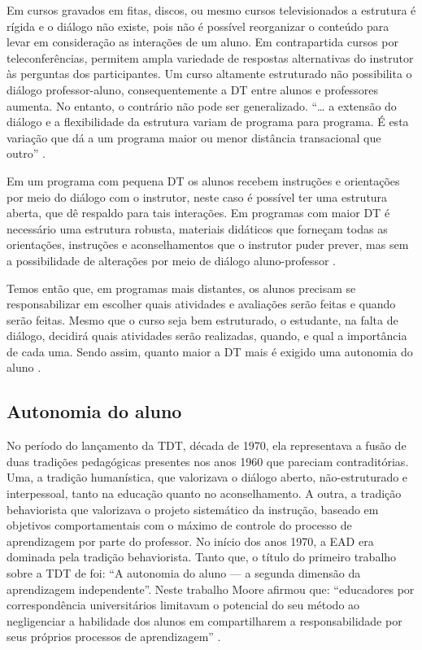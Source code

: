 Em cursos gravados em fitas, discos, ou mesmo cursos televisionados a estrutura
é rígida e o diálogo não existe, pois não é possível reorganizar o conteúdo para
levar em consideração as interações de um aluno. Em contrapartida cursos por
teleconferências, permitem ampla variedade de respostas alternativas do
instrutor às perguntas dos participantes. Um curso altamente estruturado não
possibilita o diálogo professor-aluno, consequentemente a DT entre alunos e
professores aumenta. No entanto, o contrário não pode ser generalizado. ``\ldots
a extensão do diálogo e a flexibilidade da estrutura variam de programa para
programa. É esta variação que dá a um programa maior ou menor distância
transacional que outro'' \cite{moore2008teoria}.

Em um programa com pequena DT os alunos recebem instruções e orientações por
meio do diálogo com o instrutor, neste caso é possível ter uma estrutura aberta,
que dê respaldo para tais interações. Em programas com maior DT é necessário uma
estrutura robusta, materiais didáticos que forneçam todas as orientações,
instruções e aconselhamentos que o instrutor puder prever, mas sem a
possibilidade de alterações por meio de diálogo aluno-professor
\cite{moore2008teoria}.

Temos então que, em programas mais distantes, os alunos precisam se
responsabilizar em escolher quais atividades e avaliações serão feitas e quando
serão feitas. Mesmo que o curso seja bem estruturado, o estudante, na falta de
diálogo, decidirá quais atividades serão realizadas, quando, e qual a
importância de cada uma. Sendo assim, quanto maior a DT mais é exigido uma
autonomia do aluno \cite{moore2008teoria}.


\subsection{Autonomia do aluno}

No período do lançamento da TDT, década de 1970, ela representava a fusão de
duas tradições pedagógicas presentes nos anos 1960 que pareciam contraditórias.
Uma, a tradição humanística, que valorizava o diálogo aberto, não-estruturado e
interpessoal, tanto na educação quanto no aconselhamento. A outra, a tradição
behaviorista que valorizava o projeto sistemático da instrução, baseado em
objetivos comportamentais com o máximo de controle do processo de aprendizagem
por parte do professor. No início dos anos 1970, a EAD era dominada pela
tradição behaviorista. Tanto que, o título do primeiro trabalho sobre a TDT de
 foi: ``A autonomia do aluno --- a segunda dimensão
da aprendizagem independente''. Neste trabalho Moore afirmou que: ``educadores
por correspondência universitários limitavam o potencial do seu método ao
negligenciar a habilidade dos alunos em compartilharem a responsabilidade por
seus próprios processos de aprendizagem'' \cite{moore2008teoria}.

